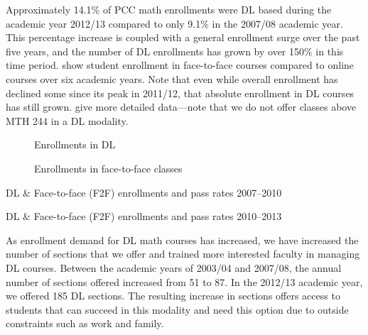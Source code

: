 Approximately 14.1\% of PCC math enrollments were DL based during the
academic year 2012/13 compared to only 9.1\% in the 2007/08 academic year.
This percentage increase is coupled with a general enrollment surge over the
past five years, and the number of DL enrollments has grown by over 150\% in
this time period.  show
student enrollment in face-to-face courses compared to online courses over six
academic years. Note that even while overall enrollment has declined some since
its peak in 2011/12, that absolute enrollment in DL courses has still grown.
 give more detailed
data---note that we do not offer classes above MTH 244 in a DL modality.

\begin{figure}[!htb]
	\begin{minipage}[t]{.5\textwidth}
		
		\caption{Enrollments in DL}\label{fig:sec3:DLenrollments}
	\end{minipage}%
	\begin{minipage}[t]{.5\textwidth}
		
		\caption{Enrollments in face-to-face classes}\label{fig:sec3:F2Fenrollments}
	\end{minipage}
\end{figure}

\begin{table}[!htb]
	\begin{widepage}
	\centering
	\caption{DL \& Face-to-face (F2F) enrollments and pass rates 2007--2010}
	\label{tab:sec3:F2FandDLdata2007}
	
	\vspace{2pc}
	\caption{DL \& Face-to-face (F2F) enrollments and pass rates 2010--2013}
	\label{tab:sec3:F2FandDLdata2010}
	
	\end{widepage}
\end{table}

As enrollment demand for DL math courses has increased, we have increased the
number of sections that we offer and trained more interested faculty in managing
DL courses.  Between the academic years of 2003/04 and 2007/08, the annual
number of sections offered increased from 51 to 87.  In the 2012/13 academic
year, we offered 185 DL sections.   The resulting increase in sections offers
access to students that can succeed in this modality and need this option due to
outside constraints such as work and family.

